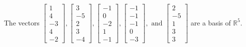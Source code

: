 \begin{exercise}
\begin{exerciseStatement}
  \end{exerciseStatement}
  \begin{exerciseAnswer}
   The vectors \(\left[\begin{array}{r}
1 \\
4 \\
-3 \\
4 \\
-2
\end{array}\right] , \left[\begin{array}{r}
3 \\
-5 \\
2 \\
3 \\
-4
\end{array}\right] , \left[\begin{array}{r}
-1 \\
0 \\
-2 \\
1 \\
-1
\end{array}\right] , \left[\begin{array}{r}
-1 \\
-1 \\
-1 \\
0 \\
-3
\end{array}\right] , \text{ and } \left[\begin{array}{r}
2 \\
-5 \\
1 \\
3 \\
3
\end{array}\right]\) 
  	 are  a basis of \(\mathbb{R}^5\).
  


  \end{exerciseAnswer}
\end{exercise}
